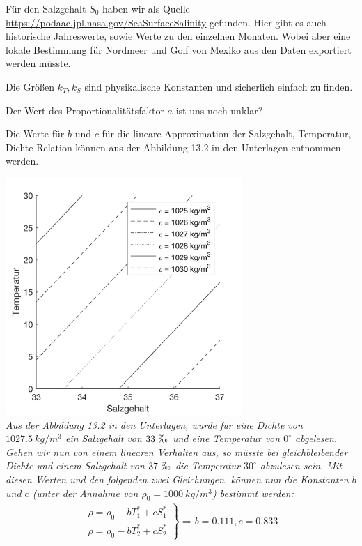 \documentclass[10pt,a4paper]{article}
\begin{document}
	Für den Salzgehalt \(S_0\) haben wir als Quelle \url{https://podaac.jpl.nasa.gov/SeaSurfaceSalinity} gefunden. Hier gibt es auch historische Jahreswerte, sowie Werte zu den einzelnen Monaten. Wobei aber eine lokale Bestimmung für Nordmeer und Golf von Mexiko aus den Daten exportiert werden müsste.
	
	Die Größen \(k_T, k_S\) sind physikalische Konstanten und sicherlich einfach zu finden.
	
	Der Wert des Proportionalitätsfaktor \(a\) ist uns noch unklar?
	
	Die Werte für \(b\) und \(c\) für die lineare Approximation der Salzgehalt, Temperatur, Dichte Relation können aus der Abbildung 13.2 in den Unterlagen entnommen werden.
	
	\begin{center}
	\includegraphics[width=9cm]{Grafik/salz_temp_dichte.png} \\
	\textit{Aus der Abbildung 13.2 in den Unterlagen, wurde für eine Dichte von \(1027.5~kg/m^3\) ein Salzgehalt von \(33~\permil\) und eine Temperatur von \(0^\circ\) abgelesen. Gehen wir nun von einem linearen Verhalten aus, so müsste bei gleichbleibender Dichte und einem Salzgehalt von \(37~\permil\) die Temperatur \(30^\circ\) abzulesen sein. Mit diesen Werten und den folgenden zwei Gleichungen, können nun die Konstanten \(b\) und \(c\) (unter der Annahme von \(\rho_0 = 1000~kg/m^3\)) bestimmt werden:}
	\begin{align*}
		\left. \begin{array}{ll}
			\rho = \rho_0 - b T^*_1 + c S^*_1 \\
			\rho = \rho_0 - b T^*_2 + c S^*_2
		\end{array} \right\}
		\Rightarrow b = 0.111, c = 0.833
	\end{align*}
	\end{center}	
	
\end{document}
